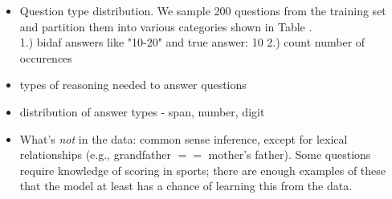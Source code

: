 \begin{itemize}
    \item Question type distribution. 
    We sample 200 questions from the training set and partition them into various categories shown in Table .\\
    1.) bidaf answers like "10-20" and true answer: 10
    2.) count number of occurences 
    \item types of reasoning needed to answer questions 
    \item distribution of answer types - span, number, digit
    \item What's \emph{not} in the data: common sense inference, except for lexical relationships (e.g., grandfather $==$ mother's father).  Some questions require knowledge of scoring in sports; there are enough examples of these that the model at least has a chance of learning this from the data.
\end{itemize}

